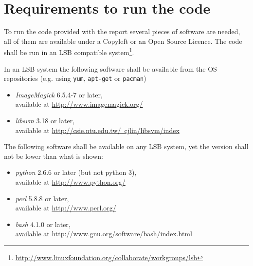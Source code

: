 \documentclass[11pt,a4paper,twoside,openright]{report}
\begin{document}
\clearpage{\pagestyle{empty}\cleardoublepage}



\appendix

\clearpage{\pagestyle{empty}\cleardoublepage}
\chapter{Requirements to run the code}
\label{chap:requirements}

To run the code provided with the report several pieces of software are needed,
all of them are available under a Copyleft or an Open Source Licence.  The code
shall be run in an LSB compatible system\footnote{
\href{http://www.linuxfoundation.org/collaborate/workgroups/lsb}
{http://www.linuxfoundation.org/collaborate/workgroups/lsb}}.

In an LSB system the following software shall be available from the OS
repositories (e.g. using \texttt{yum}, \texttt{apt-get} or \texttt{pacman})
\begin{itemize}
\item[]\emph{ImageMagick} 6.5.4-7 or later, \\
available at \href{http://www.imagemagick.org/}{http://www.imagemagick.org/}

\item[]\emph{libsvm} 3.18 or later, \\
available at \href{http://csie.ntu.edu.tw/~cjlin/libsvm/index}
{http://csie.ntu.edu.tw/~cjlin/libsvm/index}
\end{itemize}

The following software shall be available on any LSB system, yet the version
shall not be lower than what is shown:
\begin{itemize}
\item[]\emph{python} 2.6.6 or later (but not python 3), \\
available at \href{http://www.python.org/}{http://www.python.org/}

\item[]\emph{perl} 5.8.8 or later, \\
available at \href{http://www.perl.org/}{http://www.perl.org/}

\item[]\emph{bash} 4.1.0 or later, \\
available at \href{http://www.gnu.org/software/bash/index.html}
{http://www.gnu.org/software/bash/index.html}
\end{itemize}
\end{document}
